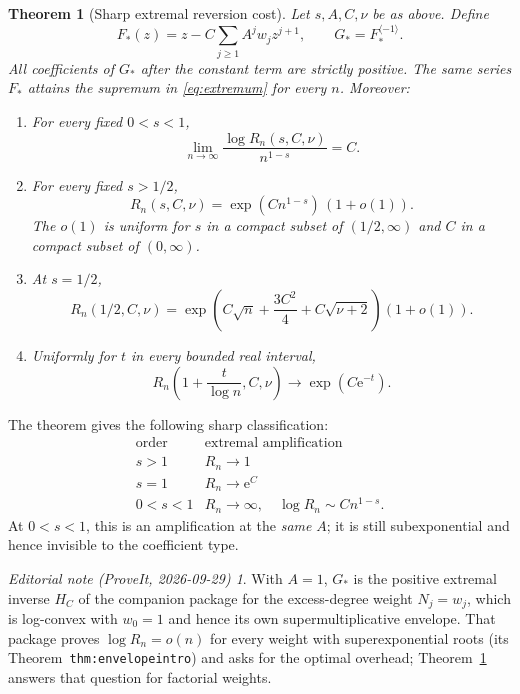 \documentclass[11pt,a4paper]{article}
\newtheorem{theorem}{Theorem}[section]
\theoremstyle{definition}
\theoremstyle{remark}
\newtheorem*{ednote}{Editorial note (ProveIt, 2026-09-29)}
\newcommand{\ee}{\mathrm e}
\newcommand{\inv}{^{\langle-1\rangle}}
\numberwithin{equation}{section}
\begin{document}
\begin{theorem}[Sharp extremal reversion cost]\label{thm:main}
Let $s,A,C,\nu$ be as above. Define
\begin{equation}
 F_*(z)=z-C\sum_{j\ge1}A^j w_j z^{j+1},\qquad G_*=F_*\inv.
 \label{eq:extremizer}
\end{equation}
All coefficients of $G_*$ after the constant term are strictly positive.
The same series $F_*$ attains the supremum in \eqref{eq:extremum} for
every $n$. Moreover:
\begin{enumerate}[label=(\roman*),leftmargin=9mm]
\item For every fixed $0<s<1$,
\begin{equation}
 \lim_{n\to\infty}\frac{\log R_n(s,C,\nu)}{n^{1-s}}=C.
 \label{eq:logmain}
\end{equation}
\item For every fixed $s>1/2$,
\begin{equation}
 R_n(s,C,\nu)=\exp(Cn^{1-s})\,(1+o(1)).
 \label{eq:multmain}
\end{equation}
The $o(1)$ is uniform for $s$ in a compact subset of $(1/2,\infty)$
and $C$ in a compact subset of $(0,\infty)$.
\item At $s=1/2$,
\begin{equation}
 R_n(1/2,C,\nu)=
 \exp\left(C\sqrt n+\frac{3C^2}{4}+C\sqrt{\nu+2}\right)(1+o(1)).
 \label{eq:halfmain}
\end{equation}
\item Uniformly for $t$ in every bounded real interval,
\begin{equation}
 R_n\left(1+\frac{t}{\log n},C,\nu\right)
 \longrightarrow \exp(C\ee^{-t}).
 \label{eq:crossover}
\end{equation}
\end{enumerate}
\end{theorem}

The theorem gives the following sharp classification:
\begin{equation}
 \begin{array}{c|c}
 \text{order} & \text{extremal amplification}\\ \hline
 s>1 & R_n\longrightarrow1\\
 s=1 & R_n\longrightarrow\ee^C\\
 0<s<1 & R_n\longrightarrow\infty,\quad
          \log R_n\sim Cn^{1-s}.
 \end{array}
 \label{eq:phase}
\end{equation}
At $0<s<1$, this is an amplification at the \emph{same} $A$; it is
still subexponential and hence invisible to the coefficient type.
\begin{ednote}
With $A=1$, $G_*$ is the positive extremal inverse $H_C$ of the companion
package  for the
excess-degree weight $N_j=w_j$, which is log-convex with $w_0=1$ and hence
its own supermultiplicative envelope. That package proves $\log R_n=o(n)$
for every weight with superexponential roots (its
Theorem~\texttt{thm:envelopeintro}) and asks for the optimal overhead;
Theorem~\ref{thm:main} answers that question for factorial weights.
\end{ednote}
\end{document}
